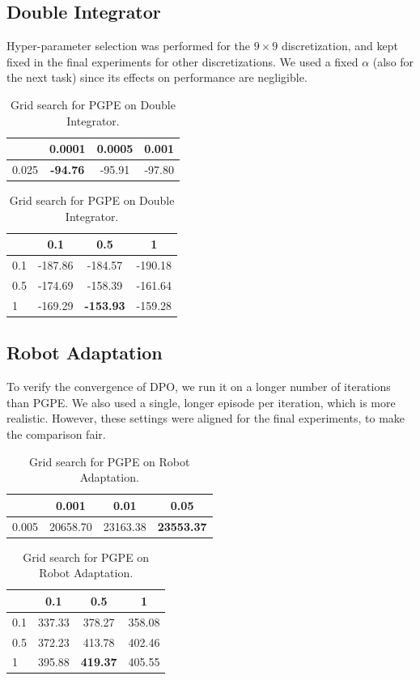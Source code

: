 \subsection*{Double Integrator} 
Hyper-parameter selection was performed for the $9\times 9$ discretization, and kept fixed in the final experiments for other discretizations. We used a fixed $\alpha$ (also for the next task) since its effects on performance are negligible. 
\begin{table}[H]
	\parbox{.45\linewidth}{
		\centering
		\begin{tabular}{l|*{3}{c}}
			\toprule
			\backslashbox{$\alpha$}{$\lambda$}
			&0.0001&0.0005&0.001\\
			\midrule
			0.025 & \textbf{-94.76} & -95.91 & -97.80 \\
			\bottomrule
		\end{tabular} \caption{\label{tab:t3}Grid search for DPO on Double Integrator.}
	}
	\hfill
	\parbox{.45\linewidth}{
		\centering
		\begin{tabular}{l|*{3}{c}}
			\toprule
			\backslashbox{$\alpha$}{$\sigma$}
			&0.1&0.5&1\\
			\midrule
			0.1 & -187.86 & -184.57 & -190.18 \\
			0.5 & -174.69 & -158.39 & -161.64 \\
			1 & -169.29 & \textbf{-153.93}	 & -159.28 \\
			\bottomrule
		\end{tabular} \caption{\label{tab:t6}Grid search for PGPE on Double Integrator.}
	}
\end{table}

\subsection*{Robot Adaptation}
To verify the convergence of DPO, we run it on a longer number of iterations than PGPE. We also used a single, longer episode per iteration, which is more realistic. However, these settings were aligned for the final experiments, to make the comparison fair.
\begin{table}[H]
	\parbox{.45\linewidth}{
		\centering
		\begin{tabular}{l|*{3}{c}}
			\toprule
			\backslashbox{$\alpha$}{$\lambda$}
			&0.001&0.01&0.05\\
			\midrule
			0.005 & 20658.70 & 23163.38 & \textbf{23553.37} \\
			\bottomrule
		\end{tabular} \caption{\label{tab:t4}Grid search for DPO on Robot Adaptation.}
	}
	\hfill
	\parbox{.45\linewidth}{
		\centering
		\begin{tabular}{l|*{3}{c}}
			\toprule
			\backslashbox{$\alpha$}{$\sigma$}
			&0.1&0.5&1\\
			\midrule
			0.1 & 337.33 & 378.27 & 358.08 \\
			0.5 & 372.23 & 413.78 & 402.46 \\
			1 & 395.88 & \textbf{419.37}	 & 405.55 \\
			\bottomrule
		\end{tabular} \caption{\label{tab:t5}Grid search for PGPE on Robot Adaptation.}
	}
\end{table}

